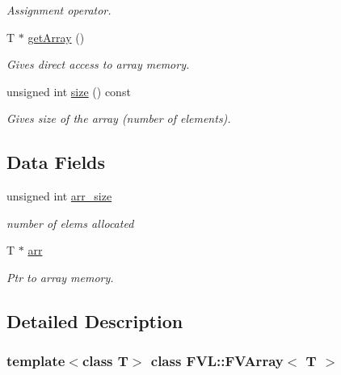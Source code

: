 \begin{DoxyCompactItemize}
\begin{DoxyCompactList}\small\item\em Assignment operator. \item\end{DoxyCompactList}\item 
T $\ast$ \hyperlink{classFVL_1_1FVArray_ad57caa1a97910998e7b9453ccbb3831c}{getArray} ()
\begin{DoxyCompactList}\small\item\em Gives direct access to array memory. \item\end{DoxyCompactList}\item 
unsigned int \hyperlink{classFVL_1_1FVArray_a90ca964ebcc1b02bbcde225edd49e812}{size} () const 
\begin{DoxyCompactList}\small\item\em Gives size of the array (number of elements). \item\end{DoxyCompactList}\end{DoxyCompactItemize}
\subsection*{Data Fields}
\begin{DoxyCompactItemize}
\item 
unsigned int \hyperlink{classFVL_1_1FVArray_a34a728cbcdbff333ec99c822697e3679}{arr\_\-size}
\begin{DoxyCompactList}\small\item\em number of elems allocated \item\end{DoxyCompactList}\item 
T $\ast$ \hyperlink{classFVL_1_1FVArray_a146e9e7358f9c0ad7b78c73519623f6c}{arr}
\begin{DoxyCompactList}\small\item\em Ptr to array memory. \item\end{DoxyCompactList}\end{DoxyCompactItemize}


\subsection{Detailed Description}
\subsubsection*{template$<$class T$>$ class FVL::FVArray$<$ T $>$}

